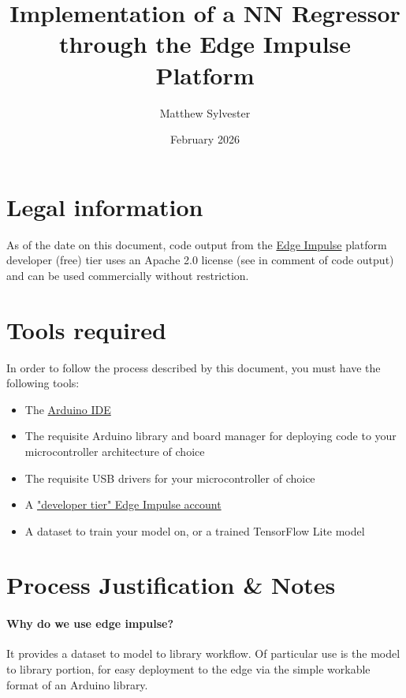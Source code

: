 \documentclass{article}
\title{Implementation of a NN Regressor through the Edge Impulse Platform}
\author{Matthew Sylvester}
\date{February 2026}
\begin{document}
\maketitle

\tableofcontents

\section{Legal information}

As of the date on this document, code output from the \href{https://www.edgeimpulse.com/legal/terms-of-service}{Edge Impulse} platform developer (free) tier uses an Apache 2.0 license (see in comment of code output) and can be used commercially without restriction.

\section{Tools required}

In order to follow the process described by this document, you must have the following tools:

\begin{itemize}
    \item The \href{https://www.arduino.cc/en/software/}{Arduino IDE}
    \item The requisite Arduino library and board manager for deploying code to your microcontroller architecture of choice
    \item The requisite USB drivers for your microcontroller of choice
    \item A \href{https://studio.edgeimpulse.com/signup}{"developer tier" Edge Impulse account}
    \item A dataset to train your model on, or a trained TensorFlow Lite model
\end{itemize}

\section{Process Justification \& Notes}

\paragraph{Why do we use edge impulse?}
It provides a dataset to model to library workflow. Of particular use is the model to library portion, for easy deployment to the edge via the simple workable format of an Arduino library.
\end{document}

